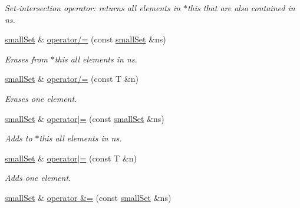 \begin{CompactItemize}
\begin{CompactList}\small\item\em Set-intersection operator: returns all elements in $\ast$this that are also contained in ns. \item\end{CompactList}\item 
\hypertarget{classdai_1_1smallSet_5a53d38881904f6c7f2e2bbc4489790c}{
\hyperlink{classdai_1_1smallSet}{smallSet} \& \hyperlink{classdai_1_1smallSet_5a53d38881904f6c7f2e2bbc4489790c}{operator/=} (const \hyperlink{classdai_1_1smallSet}{smallSet} \&ns)}
\label{classdai_1_1smallSet_5a53d38881904f6c7f2e2bbc4489790c}

\begin{CompactList}\small\item\em Erases from $\ast$this all elements in ns. \item\end{CompactList}\item 
\hypertarget{classdai_1_1smallSet_8d3db122106f3ea6be80ceafd41316bb}{
\hyperlink{classdai_1_1smallSet}{smallSet} \& \hyperlink{classdai_1_1smallSet_8d3db122106f3ea6be80ceafd41316bb}{operator/=} (const T \&n)}
\label{classdai_1_1smallSet_8d3db122106f3ea6be80ceafd41316bb}

\begin{CompactList}\small\item\em Erases one element. \item\end{CompactList}\item 
\hypertarget{classdai_1_1smallSet_c2e95c8464389c28d989a7e2013999ed}{
\hyperlink{classdai_1_1smallSet}{smallSet} \& \hyperlink{classdai_1_1smallSet_c2e95c8464389c28d989a7e2013999ed}{operator$|$=} (const \hyperlink{classdai_1_1smallSet}{smallSet} \&ns)}
\label{classdai_1_1smallSet_c2e95c8464389c28d989a7e2013999ed}

\begin{CompactList}\small\item\em Adds to $\ast$this all elements in ns. \item\end{CompactList}\item 
\hypertarget{classdai_1_1smallSet_3ab8465276b9f0533b7f641c87dca9e9}{
\hyperlink{classdai_1_1smallSet}{smallSet} \& \hyperlink{classdai_1_1smallSet_3ab8465276b9f0533b7f641c87dca9e9}{operator$|$=} (const T \&n)}
\label{classdai_1_1smallSet_3ab8465276b9f0533b7f641c87dca9e9}

\begin{CompactList}\small\item\em Adds one element. \item\end{CompactList}\item 
\hypertarget{classdai_1_1smallSet_dfcfeeb334b9f46115185c9320ba655b}{
\hyperlink{classdai_1_1smallSet}{smallSet} \& \hyperlink{classdai_1_1smallSet_dfcfeeb334b9f46115185c9320ba655b}{operator \&=} (const \hyperlink{classdai_1_1smallSet}{smallSet} \&ns)}
\label{classdai_1_1smallSet_dfcfeeb334b9f46115185c9320ba655b}


\end{CompactItemize}
